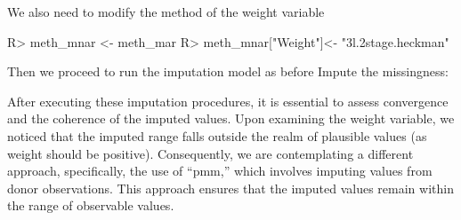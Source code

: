 \documentclass[
]{jss}
\begin{document}
We also need to modify the method of the weight variable

\begin{CodeChunk}
\begin{CodeInput}
R> meth_mnar <- meth_mar
R> meth_mnar["Weight"]<- "3l.2stage.heckman"
\end{CodeInput}
\end{CodeChunk}

Then we proceed to run the imputation model as before Impute the
missingness:

After executing these imputation procedures, it is essential to assess
convergence and the coherence of the imputed values. Upon examining the
weight variable, we noticed that the imputed range falls outside the
realm of plausible values (as weight should be positive). Consequently,
we are contemplating a different approach, specifically, the use of
``pmm,'' which involves imputing values from donor observations. This
approach ensures that the imputed values remain within the range of
observable values.
\end{document}
